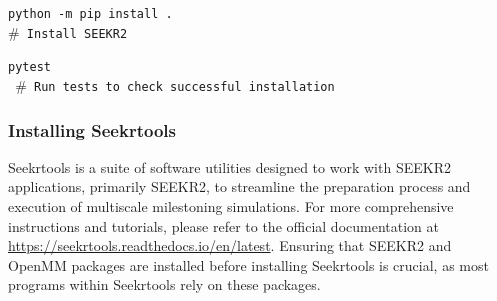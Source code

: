 \documentclass[9pt,training,pubversion]{livecoms}
\newcommand{\seekrtoolslink}{\url{https://seekrtools.readthedocs.io/en/latest}}
\begin{document}
\begin{tcolorbox}[colback=black!8!white, colframe=black!50!black, fontlower=\tiny, left=2pt, right=2pt, top=2pt, bottom=2pt] 
\texttt{python -m pip install .} \\
\texttt{$\#$ Install SEEKR2}
\end{tcolorbox}

\begin{tcolorbox}[colback=black!8!white, colframe=black!50!black, fontlower=\tiny, left=2pt, right=2pt, top=2pt, bottom=2pt] 
\texttt{pytest} \\
\texttt{ $\#$ Run tests to check successful installation}
\end{tcolorbox}


\subsubsection{Installing Seekrtools}
\vspace{2mm}

\noindent Seekrtools is a suite of software utilities designed to work with SEEKR2 applications, primarily SEEKR2, to streamline the preparation process and execution of multiscale milestoning simulations. For more comprehensive instructions and tutorials, please refer to the official documentation at \seekrtoolslink. Ensuring that SEEKR2 and OpenMM packages are installed before installing Seekrtools is crucial, as most programs within Seekrtools rely on these packages. \par
\end{document}
